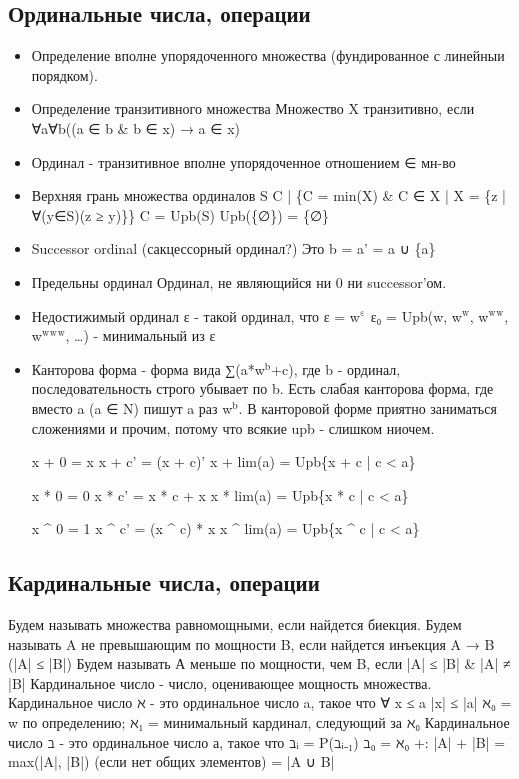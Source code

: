 \documentclass[11pt]{article}
\begin{document}
\subsection{Ординальные числа, операции}
\label{sec-2-41}
\begin{itemize}
\item Определение вполне упорядоченного множества (фундированное
с линейныи порядком).
\item Определение транзитивного множества
Множество X транзитивно, если
∀a∀b((a ∈ b \& b ∈ x) → a ∈ x)
\item Ординал - транзитивное вполне упорядоченное отношением ∈ мн-во
\item Верхняя грань множества ординалов S
C | \{C = min(X) \& C ∈ X | X = \{z | ∀(y∈S)(z ≥ y)\}\}
C = Upb(S)
Upb(\{∅\}) = \{∅\}
\item Successor ordinal (сакцессорный ординал?)
Это b = a' = a ∪ \{a\}
\item Предельны ординал
Ординал, не являющийся ни 0 ни successor'ом.
\item Недостижимый ординал
ε - такой ординал, что ε = w$^{\text{ε}}$
ε₀ = Upb(w, w$^{\text{w}}$, w$^{\text{w}}$$^{\text{w}}$, w$^{\text{w}}$$^{\text{w}}$$^{\text{w}}$, \ldots{}) - минимальный из ε
\item Канторова форма - форма вида ∑(a*w$^{\text{b}}$+c), где b - ординал, последовательность
строго убывает по b. Есть слабая канторова форма, где вместо a (a ∈ N)
пишут a раз w$^{\text{b}}$. В канторовой форме приятно заниматься сложениями и
прочим, потому что всякие upb - слишком ниочем.

x + 0       = x
x + c'      = (x + c)'
x + lim(a)  = Upb\{x + c | c < a\}

x * 0       = 0
x * c'      = x * c + x
x * lim(a)  = Upb\{x * c | c < a\}

x \^{} 0       = 1
x \^{} c'      = (x \^{} c) * x
x \^{} lim(a)  = Upb\{x \^{} c | c < a\}
\end{itemize}
\subsection{Кардинальные числа, операции}
\label{sec-2-42}
Будем называть множества равномощными, если найдется биекция.
Будем называть A не превышающим по мощности B, если найдется
инъекция A → B (|A| ≤ |B|)
Будем называть А меньше по мощности, чем B, если |A| ≤ |B| \& |A| ≠ |B|
Кардинальное число - число, оценивающее мощность множества.
Кардинальное число ℵ - это ординальное число a, такое что
∀ x ≤ a |x| ≤ |a|
ℵ₀ = w по определению; ℵ₁ = минимальный кардинал, следующий за ℵ₀
Кардинальное число ℶ - это ординальное число а, такое что
ℶᵢ = P(ℶᵢ₋₁)
ℶ₀ = ℵ₀
+: |A| + |B| = max(|A|, |B|) (если нет общих элементов) = |A ∪ B|
\end{document}
